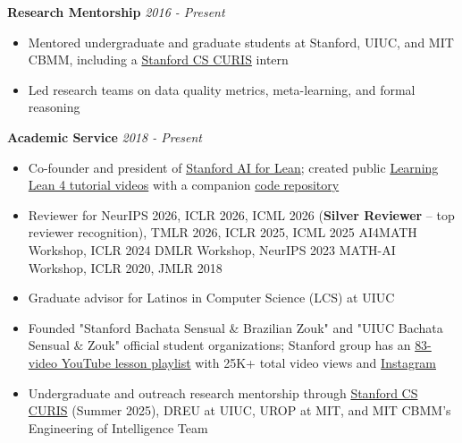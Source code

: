\documentclass{article}
\newenvironment{changemargin}[2]{%
  \begin{list}{}{%
    \setlength{\topsep}{0pt}%
    \setlength{\leftmargin}{#1}%
    \setlength{\rightmargin}{#2}%
    \setlength{\listparindent}{\parindent}%
    \setlength{\itemindent}{\parindent}%
    \setlength{\parsep}{\parskip}%
  }%
  \item[]}{\end{list}
}
\newenvironment{body} {
		\vspace*{-16pt}
		\begin{changemargin}{-0.25in}{-0.5in}
	  }
		{\end{changemargin}\vspace{8pt plus 12pt}
	}
\begin{document}
\begin{body}
    \vspace{12pt}

\textbf{Research Mentorship} \hfill \emph{2016 - Present}\\
\vspace*{-3pt}
\begin{itemize} \itemsep -2pt
    \item Mentored undergraduate and graduate students at Stanford, UIUC, and MIT CBMM, including a \href{https://www.cs.stanford.edu/bachelors/research-opportunities}{Stanford CS CURIS} intern
    \item Led research teams on data quality metrics, meta-learning, and formal reasoning
\end{itemize}
\vspace{8pt}

\textbf{Academic Service} \hfill \emph{2018 - Present}\\
\vspace*{-3pt}
\begin{itemize} \itemsep -2pt
    \item Co-founder and president of \href{https://www.stanfordlean.club/}{Stanford AI for Lean}; created public \href{https://www.youtube.com/playlist?list=PLB3sDpSRdrOt68MTR6kdI0Jc85Uuw1YWV}{Learning Lean 4 tutorial videos} with a companion \href{https://github.com/brando90/learning_lean/tree/main}{code repository}
    \item Reviewer for NeurIPS 2026, ICLR 2026, ICML 2026 (\textbf{Silver Reviewer} -- top reviewer recognition), TMLR 2026, ICLR 2025, ICML 2025 AI4MATH Workshop, ICLR 2024 DMLR Workshop, NeurIPS 2023 MATH-AI Workshop, ICLR 2020, JMLR 2018
    \item Graduate advisor for Latinos in Computer Science (LCS) at UIUC
    \item Founded "Stanford Bachata Sensual \& Brazilian Zouk" and "UIUC Bachata Sensual \& Zouk" official student organizations; Stanford group has an \href{https://www.youtube.com/playlist?list=PLB3sDpSRdrOt6iKyPucMJAwbwW2YtMs3V}{83-video YouTube lesson playlist} with 25K+ total video views and \href{https://www.instagram.com/stanford_bachata_sensual_zouk/}{Instagram}
    \item Undergraduate and outreach research mentorship through \href{https://www.cs.stanford.edu/bachelors/research-opportunities}{Stanford CS CURIS} (Summer 2025), DREU at UIUC, UROP at MIT, and MIT CBMM's Engineering of Intelligence Team
\end{itemize}

\end{body}
\end{document}
